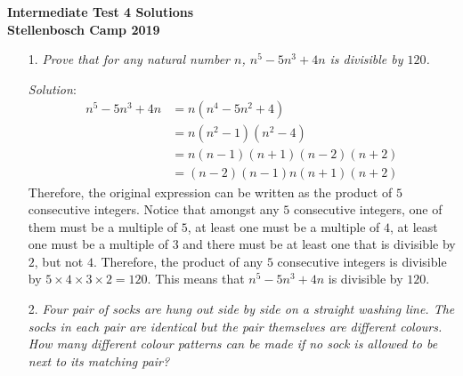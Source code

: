 \documentclass{article}
\begin{document}
\begin{center}
  \textbf{\Large Intermediate Test 4 Solutions}
  \\ \vspace{1em}
  \textbf{\large Stellenbosch Camp 2019}
\end{center}

\vspace{12pt}

\begin{enumerate}[1.]

\item[1.] %
\textit{Prove that for any natural number $n$, $n^5-5n^3+4n$ is divisible by $120$. }

\textit{Solution}:
\begin{align*}
  n^5 - 5n^3 + 4n &= n(n^4 - 5n^2 + 4) \\
  &= n(n^2 - 1)(n^2 - 4) \\
  &= n(n - 1)(n + 1)(n - 2)(n + 2) \\
  &= (n - 2)(n - 1)n(n + 1)(n + 2)
\end{align*}
Therefore, the original expression can be written as the product of $5$ consecutive integers. Notice that amongst any $5$ consecutive integers, one of them must be a multiple of $5$, at least one must be a multiple of $4$, at least one must be a multiple of $3$ and there must be at least one that is divisible by $2$, but not $4$.
Therefore, the product of any $5$ consecutive integers is divisible by $5 \times 4 \times 3 \times 2 = 120$. This means that $n^5 - 5n^3 + 4n$ is divisible by $120$.

\item[2.] %
\textit{Four pair of socks are hung out side by side on a straight washing line.
The socks in each pair are identical but the pair themselves are different colours.
How many different colour patterns can be made if no sock is allowed to be next to its matching pair?
}


\end{enumerate}
\end{document}
